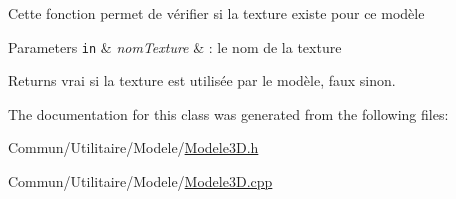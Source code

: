 Cette fonction permet de vérifier si la texture existe pour ce modèle


\begin{DoxyParams}[1]{Parameters}
\mbox{\tt in}  & {\em nom\+Texture} & \+: le nom de la texture\\
\hline
\end{DoxyParams}
\begin{DoxyReturn}{Returns}
vrai si la texture est utilisée par le modèle, faux sinon. 
\end{DoxyReturn}


The documentation for this class was generated from the following files\+:\begin{DoxyCompactItemize}
\item 
Commun/\+Utilitaire/\+Modele/\hyperlink{_modele3_d_8h}{Modele3\+D.\+h}\item 
Commun/\+Utilitaire/\+Modele/\hyperlink{_modele3_d_8cpp}{Modele3\+D.\+cpp}\end{DoxyCompactItemize}

